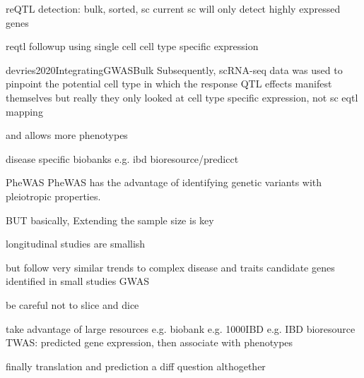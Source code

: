 \begin{outline}

        reQTL detection: bulk, sorted, sc
        current sc will only detect highly expressed genes

        reqtl followup using single cell cell type specific expression

        devries2020IntegratingGWASBulk
        Subsequently, scRNA-seq data was used to pinpoint the potential cell type in which the response QTL effects manifest themselves
            but really they only looked at cell type specific expression, not sc eqtl mapping

and allows
more phenotypes
        
        disease specific biobanks e.g. ibd bioresource/predicct


    PheWAS\autocite{verma2017CurrentScopeChallenges}
    PheWAS has the advantage of identifying genetic variants with pleiotropic properties.

BUT basically, Extending the sample size is key

    longitudinal studies are smallish

    but follow very similar trends to complex disease and traits
        candidate genes identified in small studies
        GWAS

    be careful not to slice and dice

    take advantage of large resources
    e.g. biobank
    e.g. 1000IBD
    e.g. IBD bioresource
        TWAS: predicted gene expression, then associate with phenotypes

finally translation and prediction
    a diff question althogether


\end{outline}

